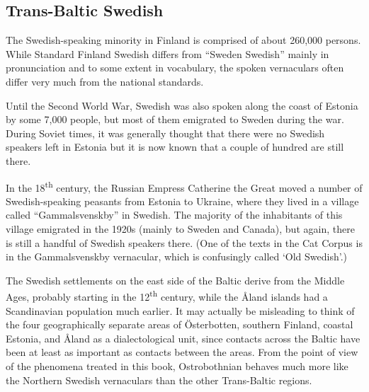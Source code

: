 \subsection{ Trans-Baltic Swedish}

The Swedish-speaking minority in Finland is comprised of about 260,000 persons. While Standard Finland Swedish differs from “Sweden Swedish” mainly in pronunciation and to some extent in vocabulary, the spoken vernaculars often differ very much from the national standards. 


Until the Second World War, Swedish was also spoken along the coast of Estonia by some 7,000 people, but most of them emigrated to Sweden during the war. During Soviet times, it was generally thought that there were no Swedish speakers left in Estonia but it is now known that a couple of hundred are still there.


In the 18\textsuperscript{th} century, the Russian Empress Catherine the Great moved a number of Swedish-speaking peasants from Estonia to Ukraine, where they lived in a village called “Gammalsvenskby” in Swedish. The majority of the inhabitants of this village emigrated in the 1920s (mainly to Sweden and Canada), but again, there is still a handful of Swedish speakers there. (One of the texts in the Cat Corpus is in the Gammalsvenskby vernacular, which is confusingly called  ‘Old Swedish’.)


The Swedish settlements on the east side of the Baltic derive from the Middle Ages, probably starting in the 12\textsuperscript{th} century, while the Åland islands had a Scandinavian population much earlier. It may actually be misleading to think of the four geographically separate areas of Österbotten, southern Finland, coastal Estonia, and Åland as a dialectological unit, since contacts across the Baltic have been at least as important as contacts between the areas. From the point of view of the phenomena treated in this book, Ostrobothnian behaves much more like the Northern Swedish vernaculars than the other Trans-Baltic regions.

